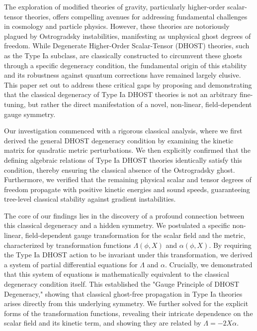 \documentclass[twocolumn]{aastex631}
\begin{document}
\label{sec:conclusions}
The exploration of modified theories of gravity, particularly higher-order scalar-tensor theories, offers compelling avenues for addressing fundamental challenges in cosmology and particle physics. However, these theories are notoriously plagued by Ostrogradsky instabilities, manifesting as unphysical ghost degrees of freedom. While Degenerate Higher-Order Scalar-Tensor (DHOST) theories, such as the Type Ia subclass, are classically constructed to circumvent these ghosts through a specific degeneracy condition, the fundamental origin of this stability and its robustness against quantum corrections have remained largely elusive. This paper set out to address these critical gaps by proposing and demonstrating that the classical degeneracy of Type Ia DHOST theories is not an arbitrary fine-tuning, but rather the direct manifestation of a novel, non-linear, field-dependent gauge symmetry.

Our investigation commenced with a rigorous classical analysis, where we first derived the general DHOST degeneracy condition by examining the kinetic matrix for quadratic metric perturbations. We then explicitly confirmed that the defining algebraic relations of Type Ia DHOST theories identically satisfy this condition, thereby ensuring the classical absence of the Ostrogradsky ghost. Furthermore, we verified that the remaining physical scalar and tensor degrees of freedom propagate with positive kinetic energies and sound speeds, guaranteeing tree-level classical stability against gradient instabilities.

The core of our findings lies in the discovery of a profound connection between this classical degeneracy and a hidden symmetry. We postulated a specific non-linear, field-dependent gauge transformation for the scalar field and the metric, characterized by transformation functions $\Lambda(\phi, X)$ and $\alpha(\phi, X)$. By requiring the Type Ia DHOST action to be invariant under this transformation, we derived a system of partial differential equations for $\Lambda$ and $\alpha$. Crucially, we demonstrated that this system of equations is mathematically equivalent to the classical degeneracy condition itself. This established the "Gauge Principle of DHOST Degeneracy," showing that classical ghost-free propagation in Type Ia theories arises directly from this underlying symmetry. We further solved for the explicit forms of the transformation functions, revealing their intricate dependence on the scalar field and its kinetic term, and showing they are related by $\Lambda = -2X\alpha$.
\end{document}

